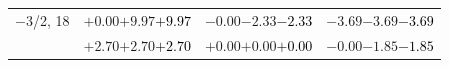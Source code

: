 \documentclass[compress]{beamer}
\begin{document}
\begin{frame}
\begin{tabular}{r | c | c | c}
$-$3/2, 18 & $+0.00$\hspace{0.1 cm}$+9.97$\hspace{0.1 cm}\textcolor{black}{$+9.97$} & $-0.00$\hspace{0.1 cm}$-2.33$\hspace{0.1 cm}\textcolor{black}{$-2.33$} & $-3.69$\hspace{0.1 cm}$-3.69$\hspace{0.1 cm}\textcolor{black}{$-3.69$} \\
           & $+2.70$\hspace{0.1 cm}$+2.70$\hspace{0.1 cm}\textcolor{black}{$+2.70$} & $+0.00$\hspace{0.1 cm}$+0.00$\hspace{0.1 cm}\textcolor{black}{$+0.00$} & $-0.00$\hspace{0.1 cm}$-1.85$\hspace{0.1 cm}\textcolor{black}{$-1.85$} \\
\end{tabular}
\end{frame}
\end{document}
